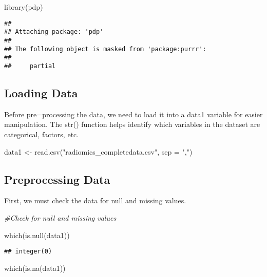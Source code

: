 \documentclass[
]{article}
\newenvironment{Shaded}{\begin{snugshade}}{\end{snugshade}}
\newcommand{\AttributeTok}[1]{\textcolor[rgb]{0.77,0.63,0.00}{#1}}
\newcommand{\CommentTok}[1]{\textcolor[rgb]{0.56,0.35,0.01}{\textit{#1}}}
\newcommand{\FunctionTok}[1]{\textcolor[rgb]{0.00,0.00,0.00}{#1}}
\newcommand{\NormalTok}[1]{#1}
\newcommand{\OtherTok}[1]{\textcolor[rgb]{0.56,0.35,0.01}{#1}}
\newcommand{\StringTok}[1]{\textcolor[rgb]{0.31,0.60,0.02}{#1}}
\begin{document}
\begin{Shaded}
\begin{Highlighting}[]
\FunctionTok{library}\NormalTok{(pdp) }
\end{Highlighting}
\end{Shaded}

\begin{verbatim}
## 
## Attaching package: 'pdp'
## 
## The following object is masked from 'package:purrr':
## 
##     partial
\end{verbatim}

\hypertarget{loading-data}{%
\subsection{Loading Data}\label{loading-data}}

Before pre=processing the data, we need to load it into a data1 variable
for easier manipulation. The str() function helps identify which
variables in the dataset are categorical, factors, etc.

\begin{Shaded}
\begin{Highlighting}[]
\NormalTok{data1 }\OtherTok{\textless{}{-}} \FunctionTok{read.csv}\NormalTok{(}\StringTok{"radiomics\_completedata.csv"}\NormalTok{, }\AttributeTok{sep =} \StringTok{","}\NormalTok{)}
\end{Highlighting}
\end{Shaded}

\hypertarget{preprocessing-data}{%
\subsection{Preprocessing Data}\label{preprocessing-data}}

First, we must check the data for null and missing values.

\begin{Shaded}
\begin{Highlighting}[]
\CommentTok{\#Check for null and missing values}

\FunctionTok{which}\NormalTok{(}\FunctionTok{is.null}\NormalTok{(data1))}
\end{Highlighting}
\end{Shaded}

\begin{verbatim}
## integer(0)
\end{verbatim}

\begin{Shaded}
\begin{Highlighting}[]
\FunctionTok{which}\NormalTok{(}\FunctionTok{is.na}\NormalTok{(data1))}
\end{Highlighting}
\end{Shaded}
\end{document}
